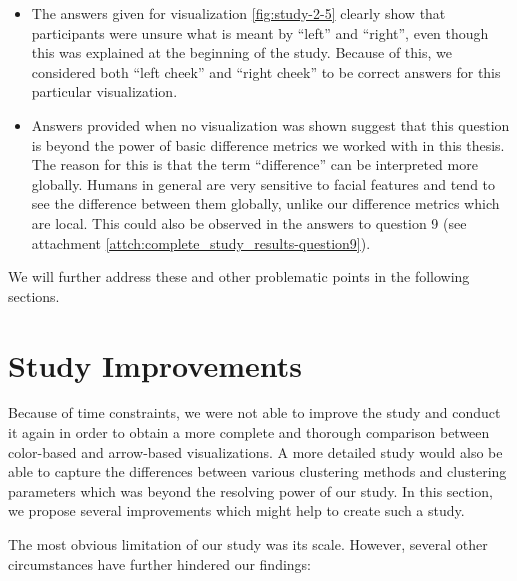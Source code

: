 
\begin{itemize}
	\item The answers given for visualization \ref{fig:study-2-5} clearly show that participants were unsure what is meant by ``left'' and ``right'', even though this was explained at the beginning of the study. Because of this, we considered both ``left cheek'' and ``right cheek'' to be correct answers for this particular visualization.
	\item Answers provided when no visualization was shown suggest that this question is beyond the power of basic difference metrics we worked with in this thesis. The reason for this is that the term ``difference'' can be interpreted more globally. Humans in general are very sensitive to facial features and tend to see the difference between them globally, unlike our difference metrics which are local. This could also be observed in the answers to question 9 (see attachment \ref{attch:complete_study_results-question9}).
\end{itemize}

We will further address these and other problematic points in the following sections.

\section{Study Improvements}
\label{sec:discussion-study_improvements}

Because of time constraints, we were not able to improve the study and conduct it again in order to obtain a more complete and thorough comparison between color-based and arrow-based visualizations. A more detailed study would also be able to capture the differences between various clustering methods and clustering parameters which was beyond the resolving power of our study. In this section, we propose several improvements which might help to create such a study.

The most obvious limitation of our study was its scale. However, several other circumstances have further hindered our findings:


